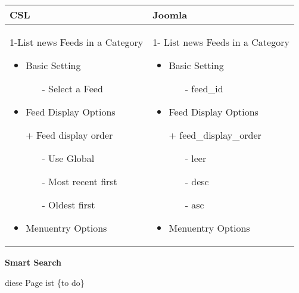 \begin{minipage}{0.7\textwidth}
\begin{tabular}{|p{} | p{}|}
\hline
\textbf{CSL} & \textbf{Joomla} \\ 
\hline
 1-List news Feeds in a Category
   \begin{itemize}
     \item Basic  Setting 
    		\begin{enumerate}
    			\item[-] Select a Feed
    		\end{enumerate}  
    \item Feed Display Options
    \item[+] Feed display order
           	\begin{enumerate}
           		\item[-] Use Global
           		\item[-] Most recent first
           		\item[-] Oldest first
           	\end{enumerate}	
 	\item Menuentry Options
  \end{itemize}
 & 
1- List news Feeds in a Category
  \begin{itemize}
    \item Basic  Setting 
   		\begin{enumerate}
   			\item[-] feed\_id
   		\end{enumerate}
   	\item Feed Display Options
   		\item[+] feed\_display\_order
   	   	\begin{enumerate}
   	   		\item[-] leer
   	   		\item[-] desc
   	   		\item[-] asc
   	   	\end{enumerate}	
	\item Menuentry Options
 \end{itemize}
\\
\hline
\end{tabular}
\end{minipage}

\textbf{Smart Search}

diese Page ist \{to do\}

